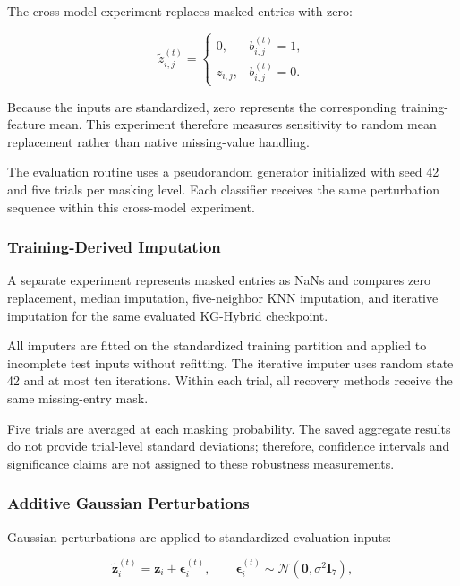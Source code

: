 The cross-model experiment replaces masked entries with zero:

\begin{equation}
\widetilde{z}_{i,j}^{(t)}
=
\begin{cases}
0, & b_{i,j}^{(t)}=1,\\
z_{i,j}, & b_{i,j}^{(t)}=0.
\end{cases}
\label{eq:robustness_zero_fill}
\end{equation}

Because the inputs are standardized, zero represents the corresponding
training-feature mean. This experiment therefore measures sensitivity
to random mean replacement rather than native missing-value handling.

The evaluation routine uses a pseudorandom generator initialized with
seed 42 and five trials per masking level. Each classifier receives
the same perturbation sequence within this cross-model experiment.

\subsubsection{Training-Derived Imputation}

A separate experiment represents masked entries as NaNs and compares
zero replacement, median imputation, five-neighbor KNN imputation,
and iterative imputation for the same evaluated KG-Hybrid checkpoint.

All imputers are fitted on the standardized training partition and
applied to incomplete test inputs without refitting. The iterative
imputer uses random state 42 and at most ten iterations. Within each
trial, all recovery methods receive the same missing-entry mask.

Five trials are averaged at each masking probability. The saved
aggregate results do not provide trial-level standard deviations;
therefore, confidence intervals and significance claims are not
assigned to these robustness measurements.

\subsubsection{Additive Gaussian Perturbations}

Gaussian perturbations are applied to standardized evaluation inputs:

\begin{equation}
\widetilde{\mathbf{z}}_i^{(t)}
=
\mathbf{z}_i+\boldsymbol{\epsilon}_i^{(t)},
\qquad
\boldsymbol{\epsilon}_i^{(t)}
\sim
\mathcal{N}(\mathbf{0},\sigma^2\mathbf{I}_7),
\label{eq:robustness_noise}
\end{equation}

